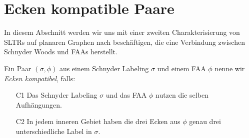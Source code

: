 \section{Ecken kompatible Paare}

In diesem Abschnitt werden wir uns mit einer zweiten Charakterisierung von SLTRs auf planaren Graphen nach \cite{af15} beschäftigen, die eine Verbindung zwischen Schnyder Woods und FAAs herstellt. 

\begin{definition}

Ein Paar $(\sigma,\phi)$ aus einem Schnyder Labeling $\sigma$ und einem FAA $\phi$ nenne wir \textit{Ecken kompatibel}, falls:
\begin{itemize}
\item [C1] Das Schnyder Labeling $\sigma$ und das FAA $\phi$ nutzen die selben Aufhängungen.
\item [C2] In jedem inneren Gebiet haben die drei Ecken aus $\phi$ genau drei unterschiedliche Label in $\sigma$.
\end{itemize}

\end{definition}